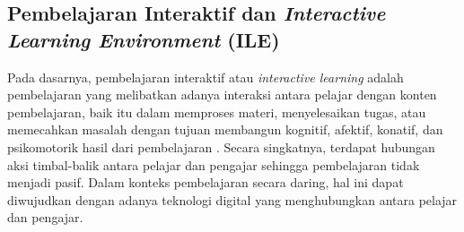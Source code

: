 
\subsection{Pembelajaran Interaktif dan \textit{Interactive Learning Environment} (ILE)}

Pada dasarnya, pembelajaran interaktif atau \textit{interactive learning} adalah pembelajaran yang melibatkan adanya interaksi antara pelajar dengan konten pembelajaran, baik itu dalam memproses materi, menyelesaikan tugas, atau memecahkan masalah dengan tujuan membangun kognitif, afektif, konatif, dan psikomotorik hasil dari pembelajaran \parencite{reeves2012interactive}. Secara singkatnya, terdapat hubungan aksi timbal-balik antara pelajar dan pengajar sehingga pembelajaran tidak menjadi pasif. Dalam konteks pembelajaran secara daring, hal ini dapat diwujudkan dengan adanya teknologi digital yang menghubungkan antara pelajar dan pengajar.

